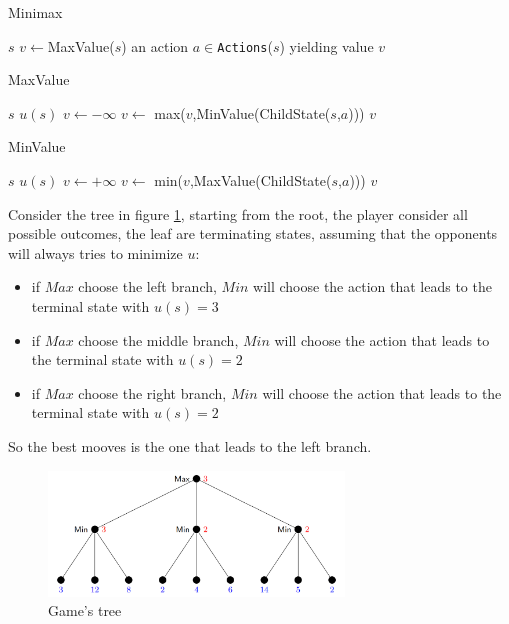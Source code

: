 \documentclass[10pt, letterpaper]{report}
\begin{document}
 \begin{algorithm}
    \caption{Minimax}\label{alg:minimax}
    \begin{algorithmic}
    \Require $s$
    \State $v\leftarrow$MaxValue($s$)
    \State\Return an action $a\in $\texttt{Actions}($s$) yielding value $v$
    \end{algorithmic}
\end{algorithm}
 \begin{algorithm}
    \caption{MaxValue}\label{alg:MaxValue}
    \begin{algorithmic}
    \Require $s$
    \State\Return $u(s)$
    \EndIf
    \State$v\leftarrow -\infty$
    \State $v\leftarrow$ max($v$,MinValue(ChildState($s$,$a$)))
    \EndFor 
    \State\Return $v$
    \end{algorithmic}
\end{algorithm}
 \begin{algorithm}
    \caption{MinValue}\label{alg:MinValue}
    \begin{algorithmic}
    \Require $s$
    \State\Return $u(s)$
    \EndIf
    \State$v\leftarrow +\infty$
    \State $v\leftarrow$ min($v$,MaxValue(ChildState($s$,$a$)))
    \EndFor 
    \State\Return $v$
    \end{algorithmic}
\end{algorithm}

Consider the tree in figure \ref{fig:minmax}, starting from the root, the player consider all possible outcomes, the leaf are terminating states, assuming that the opponents will always tries to minimize $u$:\begin{itemize}
    \item if $Max$ choose the left branch, $Min$ will choose the action that leads to the terminal state with $u(s)=3$
    \item if $Max$ choose the middle branch, $Min$ will choose the action that leads to the terminal state with $u(s)=2$
    \item if $Max$ choose the right branch, $Min$ will choose the action that leads to the terminal state with $u(s)=2$
\end{itemize}
So the best mooves is the one that leads to the left branch.
\begin{figure}[h!]
    \centering
    \includegraphics[width=0.7\textwidth ]{images/minmaxtree.png}
    \caption{Game's tree }
    \label{fig:minmax}
\end{figure}
\end{document}
